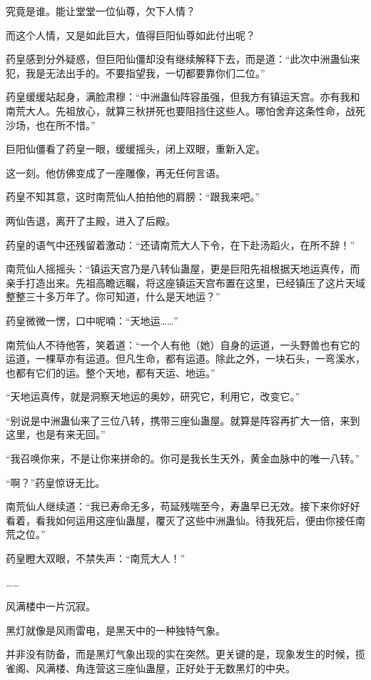\begin{this_body}
究竟是谁。能让堂堂一位仙尊，欠下人情？

而这个人情，又是如此巨大，值得巨阳仙尊如此付出呢？

药皇感到分外疑惑，但巨阳仙僵却没有继续解释下去，而是道：“此次中洲蛊仙来犯，我是无法出手的。不要指望我，一切都要靠你们二位。”

药皇缓缓站起身，满脸肃穆：“中洲蛊仙阵容虽强，但我方有镇运天宫。亦有我和南荒大人。先祖放心，就算三秋拼死也要阻挡住这些人。哪怕舍弃这条性命，战死沙场，也在所不惜。”

巨阳仙僵看了药皇一眼，缓缓摇头，闭上双眼，重新入定。

这一刻。他仿佛变成了一座雕像，再无任何言语。

药皇不知其意，这时南荒仙人拍拍他的肩膀：“跟我来吧。”

两仙告退，离开了主殿，进入了后殿。

药皇的语气中还残留着激动：“还请南荒大人下令，在下赴汤蹈火，在所不辞！”

南荒仙人摇摇头：“镇运天宫乃是八转仙蛊屋，更是巨阳先祖根据天地运真传，而亲手打造出来。先祖高瞻远瞩，将这座镇运天宫布置在这里，已经镇压了这片天域整整三十多万年了。你可知道，什么是天地运？”

药皇微微一愣，口中呢喃：“天地运……”

南荒仙人不待他答，笑着道：“一个人有他（她）自身的运道，一头野兽也有它的运道，一棵草亦有运道。但凡生命，都有运道。除此之外，一块石头，一弯溪水，也都有它们的运。整个天地，都有天运、地运。”

“天地运真传，就是洞察天地运的奥妙，研究它，利用它，改变它。”

“别说是中洲蛊仙来了三位八转，携带三座仙蛊屋。就算是阵容再扩大一倍，来到这里，也是有来无回。”

“我召唤你来，不是让你来拼命的。你可是我长生天外，黄金血脉中的唯一八转。”

“啊？”药皇惊讶无比。

南荒仙人继续道：“我已寿命无多，苟延残喘至今，寿蛊早已无效。接下来你好好看着，看我如何运用这座仙蛊屋，覆灭了这些中洲蛊仙。待我死后，便由你接任南荒之位。”

药皇瞪大双眼，不禁失声：“南荒大人！”

……

风满楼中一片沉寂。

黑灯就像是风雨雷电，是黑天中的一种独特气象。

并非没有防备，而是黑灯气象出现的实在突然。更关键的是，现象发生的时候，揽雀阁、风满楼、角连营这三座仙蛊屋，正好处于无数黑灯的中央。


\end{this_body}
